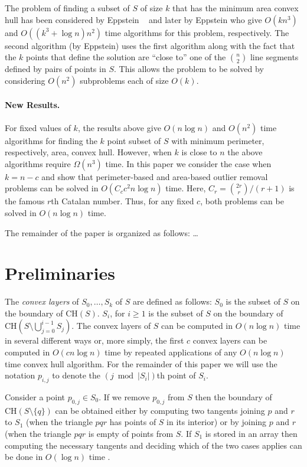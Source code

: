 \documentclass[lotsofwhite]{patmorin}
\newcommand{\ch}{\mathrm{CH}}
\newcommand{\ntypes}{C_c}
\newcommand{\timepertype}{c^2 n\log n}
\newcommand{\runtime}{\ntypes \timepertype}
\begin{document}
The problem of finding a subset of $S$ of size $k$ that has the
minimum area convex hull has been considered by Eppstein \etal\
\cite{eorw92} and later by Eppstein \cite{e93} who give $O(kn^{3})$
and $O((k^3+\log n) n^2)$ time algorithms for this problem,
respectively.  The second algorithm (by Eppstein) uses the first
algorithm along with the fact that the $k$ points that define the
solution are ``close to'' one of the $n\choose 2$ line segments
defined by pairs of points in $S$.  This allows the problem to be
solved by considering $O(n^2)$ subproblems each of size $O(k)$.

\paragraph{New Results.}

For fixed values of $k$, the results above give $O(n\log n)$ and
$O(n^2)$ time algorithms for finding the $k$ point subset of $S$ with
minimum perimeter, respectively, area, convex hull.  However, when $k$
is close to $n$ the above algorithms require $\Omega(n^3)$ time.  In
this paper we consider the case when $k=n-c$ and show that
perimeter-based and area-based outlier removal problems can be solved
in $O(\runtime)$ time.  Here, $C_r={2r \choose r}/(r+1)$ is the famous
$r$th Catalan number.  Thus, for any fixed $c$, both problems can be
solved in $O(n\log n)$ time.

The remainder of the paper is organized as follows: \ldots

\section{Preliminaries}

The \emph{convex layers} of $S_0,\ldots,S_k$ of $S$ are defined as
follows: $S_0$ is the subset of $S$ on the boundary of $\ch(S)$.
$S_i$, for $i\ge 1$ is the subset of $S$ on the boundary of
$\ch(S\setminus\bigcup_{j=0}^{i-1} S_j)$.  The convex layers of $S$
can be computed in $O(n\log n)$ time in several different ways
\cite{X,Y,Z} or, more simply, the first $c$ convex layers can be
computed in $O(cn\log n)$ time by repeated applications of any
$O(n\log n)$ time convex hull algorithm.  For the remainder of this
paper we will use the notation $p_{i,j}$ to denote the $(j\bmod
|S_i|)$th point of $S_i$.

Consider a point $p_{0,j}\in S_0$.  If we remove $p_{0,j}$ from $S$
then the boundary of $\ch(S\setminus\{q\})$ can be obtained either by
computing two tangents joining $p$ and $r$ to $S_1$ (when the triangle
$pqr$ has points of $S$ in its interior) or by joining $p$ and $r$
(when the triangle $pqr$ is empty of points from $S$.  If $S_1$ is
stored in an array then computing the necessary tangents and deciding
which of the two cases applies can be done in $O(\log n)$ time
\cite{X}.
\end{document}
